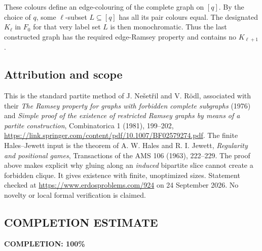 These colours define an edge-colouring of the complete graph on \([q]\). By the choice of \(q\), some \(\ell\)-subset \(L\subseteq[q]\) has all its pair colours equal. The designated \(K_\ell\) in \(F_0\) for that very label set \(L\) is then monochromatic.
Thus the last constructed graph has the required edge-Ramsey property and contains no \(K_{\ell+1}\).

\subsection*{Attribution and scope}
This is the standard partite method of J. Ne\v{s}et\v{r}il and V. R\"odl, associated with their \emph{The Ramsey property for graphs with forbidden complete subgraphs} (1976) and \emph{Simple proof of the existence of restricted Ramsey graphs by means of a partite construction}, Combinatorica 1 (1981), 199--202, \url{https://link.springer.com/content/pdf/10.1007/BF02579274.pdf}. The finite Hales--Jewett input is the theorem of A. W. Hales and R. I. Jewett, \emph{Regularity and positional games}, Transactions of the AMS 106 (1963), 222--229.
The proof above makes explicit why gluing along an \emph{induced} bipartite slice cannot create a forbidden clique. It gives existence with finite, unoptimized sizes. Statement checked at \url{https://www.erdosproblems.com/924} on 24 September 2026. No novelty or local formal verification is claimed.
\subsection*{COMPLETION ESTIMATE}
\textbf{COMPLETION: 100\%}
